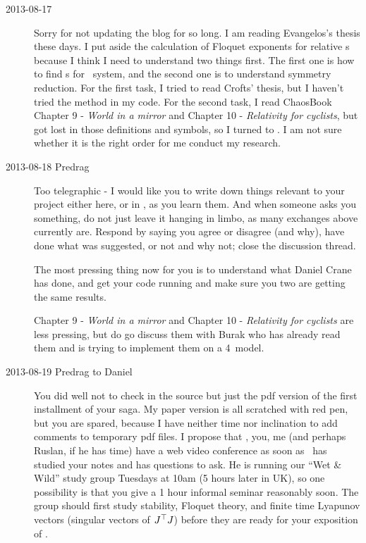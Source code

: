 \begin{description}
\item[2013-08-17 \XD]
Sorry for not updating the blog for so long. I am reading Evangelos's thesis
these days. I put aside the calculation of Floquet exponents for relative \po s
because I think I need to understand two things first. The first one is how to find
\po s for \KS\ system, and the second one is to understand symmetry reduction.
For the first task, I tried to read Crofts' thesis,
but I haven't tried the method in my code.
For the second task, I read ChaosBook
 {Chapter
    9} - {\em World in a mirror}
 and
 {Chapter 10} - {\em Relativity for cyclists},
but got lost in those definitions
and symbols, so I turned to .
I am not sure whether it is
the right order for me conduct my research.

\item[2013-08-18 Predrag] Too telegraphic - I would like you to write down
things relevant to
your project  either here, or in , as you learn them.
And when someone asks you something, do not just leave it hanging
in limbo, as many exchanges
above currently are. Respond by saying you agree or disagree (and why), have done
what was suggested, or not and why not; close the discussion thread.


The most pressing thing now for you is to understand what Daniel Crane has done,
and get your code running and make sure you two are getting the same results.

 {Chapter
    9} - {\em World in a mirror}
 and
 {Chapter 10} - {\em Relativity for cyclists} are less pressing, but
do go discuss them with Burak who has already read them and is
trying to implement them on a 4\dmn\ model.

\item[2013-08-19 Predrag to Daniel] You did well not to check in the source
but just the pdf version of the
 {first installment} of your saga. My paper
version is all scratched with red pen, but you are spared, because I have neither
time nor inclination to add comments to temporary pdf files. I propose that
\XD, you, me (and perhaps Ruslan, if he has time) have a web video conference
as soon as \XD\ has studied your notes and has questions to ask. He is
running our ``Wet \& Wild'' study group Tuesdays at 10am (5 hours later in UK),
so one possibility is that you give a 1 hour informal seminar reasonably soon.
The group should first study stability, Floquet theory, and finite time
Lyapunov vectors (singular vectors of ${J}{}^\top J$) before they are ready for your
exposition of {\cLvs}.


\end{description}
